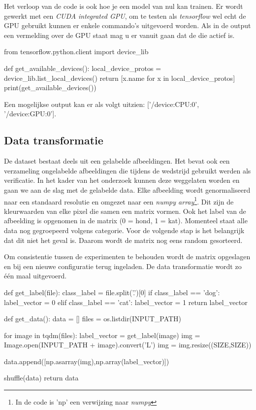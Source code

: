 Het verloop van de code is ook hoe je een model van nul kan trainen. Er wordt gewerkt met een \textit{CUDA integrated GPU}, om te testen als \textit{tensorflow} wel echt de GPU gebruikt kunnen er enkele commando's uitgevoerd worden. Als in de output een vermelding over de GPU staat mag u er vanuit gaan dat de die actief is.

\bigskip

\begin{python}
from tensorflow.python.client import device_lib

def get_available_devices():
    local_device_protos = device_lib.list_local_devices()
    return [x.name for x in local_device_protos]
print(get_available_devices()) 
\end{python}

Een mogelijkse output kan er als volgt uitzien: ['/device:CPU:0', '/device:GPU:0'].

\subsection{Data transformatie}
\label{subsec:autokeras-tranform}

De dataset bestaat deels uit een gelabelde afbeeldingen. Het bevat ook een verzameling ongelabelde afbeeldingen die tijdens de wedstrijd gebruikt werden als verificatie. In het kader van het onderzoek kunnen deze weggelaten worden en gaan we aan de slag met de gelabelde data. Elke afbeelding wordt genormaliseerd naar een standaard resolutie en omgezet naar een \textit{numpy array}\footnote{In de code is 'np' een verwijzing naar \textit{numpy}}. Dit zijn de kleurwaarden van elke pixel die samen een matrix vormen. Ook het label van de afbeelding is opgenomen in de matrix (0 = hond, 1 = kat). Momenteel staat alle data nog gegroepeerd volgens categorie. Voor de volgende stap is het belangrijk dat dit niet het geval is. Daarom wordt de matrix nog eens random gesorteerd.

Om consistentie tussen de experimenten te behouden wordt de matrix opgeslagen en bij een nieuwe configuratie terug ingeladen. De data transformatie wordt zo één maal uitgevoerd.

\bigskip

\begin{python}
def get_label(file):
    class_label = file.split('.')[0]
    if class_label == 'dog': label_vector = 0
    elif class_label == 'cat': label_vector = 1
    return label_vector
    
def get_data():
    data = []
    files = os.listdir(INPUT_PATH)
    
    for image in tqdm(files):
        label_vector = get_label(image)
        img = Image.open(INPUT_PATH + image).convert('L')
        img = img.resize((SIZE,SIZE))
    
        data.append([np.asarray(img),np.array(label_vector)])
        
    shuffle(data)
    return data

\end{python}

